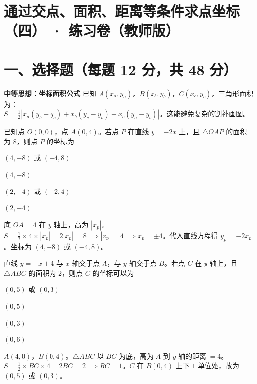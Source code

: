 \documentclass{exam-zh}
\begin{document}
\section*{通过交点、面积、距离等条件求点坐标（四） · 练习卷（教师版）}

\section*{一、选择题（每题 12 分，共 48 分）}


\begin{keyideabox}
  \textbf{中等思想：坐标面积公式}
  已知 $A(x_a, y_a)$，$B(x_b, y_b)$，$C(x_c, y_c)$，三角形面积为：\\ $S = \frac{1}{2}|x_a(y_b - y_c) + x_b(y_c - y_a) + x_c(y_a - y_b)|$。这能避免复杂的割补画图。
\end{keyideabox}



\begin{question}[points=12]
  已知点 $O(0, 0)$，点 $A(0, 4)$。若点 $P$ 在直线 $y = -2x$ 上，且 $\triangle OAP$ 的面积为 $8$，则点 $P$ 的坐标为
  \begin{choices}
    \item $(4, -8)$ 或 $(-4, 8)$
    \item $(4, -8)$
    \item $(2, -4)$ 或 $(-2, 4)$
    \item $(2, -4)$
  \end{choices}
  \paren[A]
  \begin{solutionblock}
    底 $OA = 4$ 在 $y$ 轴上，高为 $|x_p|$。$S = \frac{1}{2} \times 4 \times |x_p| = 2|x_p| = 8 \implies |x_p| = 4 \implies x_p = \pm 4$。代入直线方程得 $y_p = -2x_p$。坐标为 $(4, -8)$ 或 $(-4, 8)$。
  \end{solutionblock}
\end{question}



\begin{question}[points=12]
  直线 $y = -x + 4$ 与 $x$ 轴交于点 $A$，与 $y$ 轴交于点 $B$。若点 $C$ 在 $y$ 轴上，且 $\triangle ABC$ 的面积为 2，则点 $C$ 的坐标可以为
  \begin{choices}
    \item $(0, 5)$ 或 $(0, 3)$
    \item $(0, 5)$
    \item $(0, 3)$
    \item $(0, 6)$
  \end{choices}
  \paren[A]
  \begin{solutionblock}
    $A(4, 0)$，$B(0, 4)$。$\triangle ABC$ 以 $BC$ 为底，高为 $A$ 到 $y$ 轴的距离 $= 4$。$S = \frac{1}{2} \times BC \times 4 = 2BC = 2 \implies BC = 1$。$C$ 在 $B(0,4)$ 上下 $1$ 单位处，故为 $(0, 5)$ 或 $(0, 3)$。
  \end{solutionblock}
\end{question}
\end{document}
